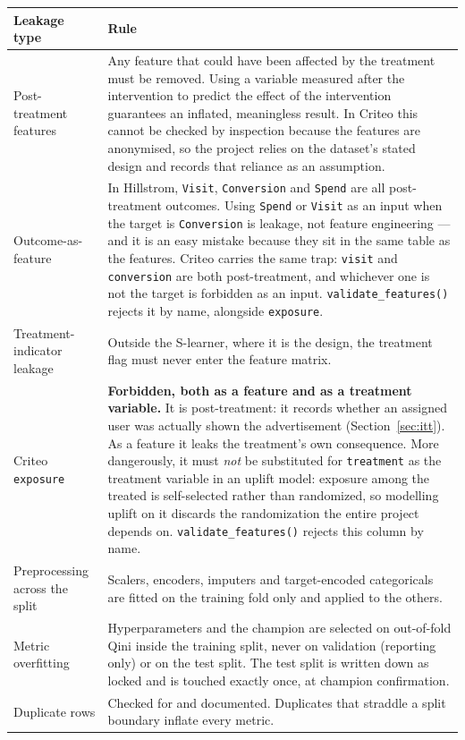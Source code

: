 \documentclass[11pt,a4paper]{article}
\begin{document}
\begin{tabularx}{\textwidth}{@{}L{4.0cm}X@{}}
\toprule
\textbf{Leakage type} & \textbf{Rule} \\
\midrule
Post-treatment features & Any feature that could have been affected by the treatment must be
removed. Using a variable measured after the intervention to predict the effect of the intervention
guarantees an inflated, meaningless result. In Criteo this cannot be checked by inspection because
the features are anonymised, so the project relies on the dataset's stated design and records that
reliance as an assumption. \\
Outcome-as-feature & In Hillstrom, \texttt{Visit}, \texttt{Conversion} and \texttt{Spend} are all
post-treatment outcomes. Using \texttt{Spend} or \texttt{Visit} as an input when the target is
\texttt{Conversion} is leakage, not feature engineering --- and it is an easy mistake because they
sit in the same table as the features. Criteo carries the same trap: \texttt{visit} and
\texttt{conversion} are both post-treatment, and whichever one is not the target is forbidden as an
input. \texttt{validate\_features()} rejects it by name, alongside \texttt{exposure}. \\
Treatment-indicator leakage & Outside the S-learner, where it is the design, the treatment flag must
never enter the feature matrix. \\
Criteo \texttt{exposure} & \textbf{Forbidden, both as a feature and as a treatment variable.} It is
post-treatment: it records whether an assigned user was actually shown the advertisement
(Section~\ref{sec:itt}). As a feature it leaks the treatment's own consequence. More dangerously,
it must \emph{not} be substituted for \texttt{treatment} as the treatment variable in an uplift
model: exposure among the treated is self-selected rather than randomized, so modelling uplift on
it discards the randomization the entire project depends on. \texttt{validate\_features()} rejects
this column by name. \\
Preprocessing across the split & Scalers, encoders, imputers and target-encoded categoricals are
fitted on the training fold only and applied to the others. \\
Metric overfitting & Hyperparameters and the champion are selected on out-of-fold Qini inside the
training split, never on validation (reporting only) or on the test split. The test
split is written down as locked and is touched exactly once, at champion confirmation. \\
Duplicate rows & Checked for and documented. Duplicates that straddle a split boundary inflate every
metric. \\
\bottomrule
\end{tabularx}
\end{document}
